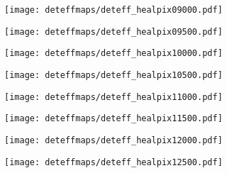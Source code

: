\begin{figure}
	\ContinuedFloat
	\centering
	\begin{subfigure}[t]{0.495\textwidth}
		\texttt{[image: deteffmaps/deteff\_healpix09000.pdf]}
		\subcaption{}
	\end{subfigure}
	\hfill
	\begin{subfigure}[t]{0.495\textwidth}
		\texttt{[image: deteffmaps/deteff\_healpix09500.pdf]}
		\subcaption{}
	\end{subfigure}
	\hfill
	\begin{subfigure}[t]{0.495\textwidth}
		\texttt{[image: deteffmaps/deteff\_healpix10000.pdf]}
		\subcaption{}
	\end{subfigure}
	\hfill
	\begin{subfigure}[t]{0.495\textwidth}
		\texttt{[image: deteffmaps/deteff\_healpix10500.pdf]}
		\subcaption{}
	\end{subfigure}
	\hfill
	\begin{subfigure}[t]{0.495\textwidth}
		\texttt{[image: deteffmaps/deteff\_healpix11000.pdf]}
		\subcaption{}
	\end{subfigure}
	\hfill
	\begin{subfigure}[t]{0.495\textwidth}
		\texttt{[image: deteffmaps/deteff\_healpix11500.pdf]}
		\subcaption{}
	\end{subfigure}
	\hfill
	\begin{subfigure}[t]{0.495\textwidth}
		\texttt{[image: deteffmaps/deteff\_healpix12000.pdf]}
		\subcaption{}
	\end{subfigure}
	\hfill
	\begin{subfigure}[t]{0.495\textwidth}
		\texttt{[image: deteffmaps/deteff\_healpix12500.pdf]}
		\subcaption{}
	\end{subfigure}
\end{figure}